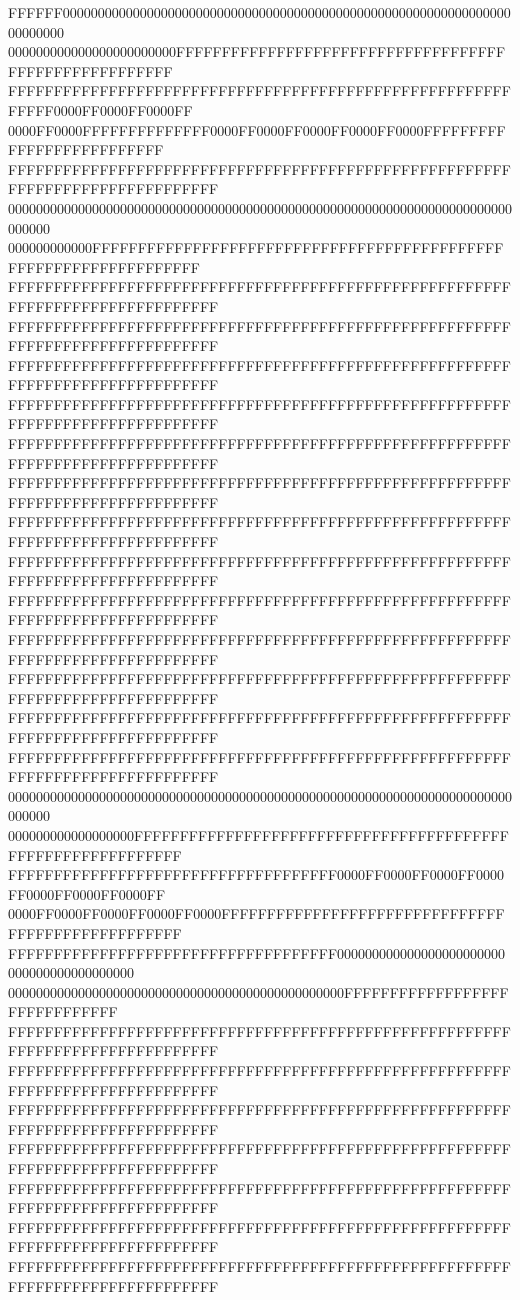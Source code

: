 FFFFFF000000000000000000000000000000000000000000000000000000000000000000000000
000000000000000000000000FFFFFFFFFFFFFFFFFFFFFFFFFFFFFFFFFFFFFFFFFFFFFFFFFFFFFF
FFFFFFFFFFFFFFFFFFFFFFFFFFFFFFFFFFFFFFFFFFFFFFFFFFFFFFFFFFFF0000FF0000FF0000FF
0000FF0000FFFFFFFFFFFFFF0000FF0000FF0000FF0000FF0000FFFFFFFFFFFFFFFFFFFFFFFFFF
FFFFFFFFFFFFFFFFFFFFFFFFFFFFFFFFFFFFFFFFFFFFFFFFFFFFFFFFFFFFFFFFFFFFFFFFFFFFFF
000000000000000000000000000000000000000000000000000000000000000000000000000000
000000000000FFFFFFFFFFFFFFFFFFFFFFFFFFFFFFFFFFFFFFFFFFFFFFFFFFFFFFFFFFFFFFFFFF
FFFFFFFFFFFFFFFFFFFFFFFFFFFFFFFFFFFFFFFFFFFFFFFFFFFFFFFFFFFFFFFFFFFFFFFFFFFFFF
FFFFFFFFFFFFFFFFFFFFFFFFFFFFFFFFFFFFFFFFFFFFFFFFFFFFFFFFFFFFFFFFFFFFFFFFFFFFFF
FFFFFFFFFFFFFFFFFFFFFFFFFFFFFFFFFFFFFFFFFFFFFFFFFFFFFFFFFFFFFFFFFFFFFFFFFFFFFF
FFFFFFFFFFFFFFFFFFFFFFFFFFFFFFFFFFFFFFFFFFFFFFFFFFFFFFFFFFFFFFFFFFFFFFFFFFFFFF
FFFFFFFFFFFFFFFFFFFFFFFFFFFFFFFFFFFFFFFFFFFFFFFFFFFFFFFFFFFFFFFFFFFFFFFFFFFFFF
FFFFFFFFFFFFFFFFFFFFFFFFFFFFFFFFFFFFFFFFFFFFFFFFFFFFFFFFFFFFFFFFFFFFFFFFFFFFFF
FFFFFFFFFFFFFFFFFFFFFFFFFFFFFFFFFFFFFFFFFFFFFFFFFFFFFFFFFFFFFFFFFFFFFFFFFFFFFF
FFFFFFFFFFFFFFFFFFFFFFFFFFFFFFFFFFFFFFFFFFFFFFFFFFFFFFFFFFFFFFFFFFFFFFFFFFFFFF
FFFFFFFFFFFFFFFFFFFFFFFFFFFFFFFFFFFFFFFFFFFFFFFFFFFFFFFFFFFFFFFFFFFFFFFFFFFFFF
FFFFFFFFFFFFFFFFFFFFFFFFFFFFFFFFFFFFFFFFFFFFFFFFFFFFFFFFFFFFFFFFFFFFFFFFFFFFFF
FFFFFFFFFFFFFFFFFFFFFFFFFFFFFFFFFFFFFFFFFFFFFFFFFFFFFFFFFFFFFFFFFFFFFFFFFFFFFF
FFFFFFFFFFFFFFFFFFFFFFFFFFFFFFFFFFFFFFFFFFFFFFFFFFFFFFFFFFFFFFFFFFFFFFFFFFFFFF
FFFFFFFFFFFFFFFFFFFFFFFFFFFFFFFFFFFFFFFFFFFFFFFFFFFFFFFFFFFFFFFFFFFFFFFFFFFFFF
000000000000000000000000000000000000000000000000000000000000000000000000000000
000000000000000000FFFFFFFFFFFFFFFFFFFFFFFFFFFFFFFFFFFFFFFFFFFFFFFFFFFFFFFFFFFF
FFFFFFFFFFFFFFFFFFFFFFFFFFFFFFFFFFFF0000FF0000FF0000FF0000FF0000FF0000FF0000FF
0000FF0000FF0000FF0000FF0000FFFFFFFFFFFFFFFFFFFFFFFFFFFFFFFFFFFFFFFFFFFFFFFFFF
FFFFFFFFFFFFFFFFFFFFFFFFFFFFFFFFFFFF000000000000000000000000000000000000000000
000000000000000000000000000000000000000000000000FFFFFFFFFFFFFFFFFFFFFFFFFFFFFF
FFFFFFFFFFFFFFFFFFFFFFFFFFFFFFFFFFFFFFFFFFFFFFFFFFFFFFFFFFFFFFFFFFFFFFFFFFFFFF
FFFFFFFFFFFFFFFFFFFFFFFFFFFFFFFFFFFFFFFFFFFFFFFFFFFFFFFFFFFFFFFFFFFFFFFFFFFFFF
FFFFFFFFFFFFFFFFFFFFFFFFFFFFFFFFFFFFFFFFFFFFFFFFFFFFFFFFFFFFFFFFFFFFFFFFFFFFFF
FFFFFFFFFFFFFFFFFFFFFFFFFFFFFFFFFFFFFFFFFFFFFFFFFFFFFFFFFFFFFFFFFFFFFFFFFFFFFF
FFFFFFFFFFFFFFFFFFFFFFFFFFFFFFFFFFFFFFFFFFFFFFFFFFFFFFFFFFFFFFFFFFFFFFFFFFFFFF
FFFFFFFFFFFFFFFFFFFFFFFFFFFFFFFFFFFFFFFFFFFFFFFFFFFFFFFFFFFFFFFFFFFFFFFFFFFFFF
FFFFFFFFFFFFFFFFFFFFFFFFFFFFFFFFFFFFFFFFFFFFFFFFFFFFFFFFFFFFFFFFFFFFFFFFFFFFFF
